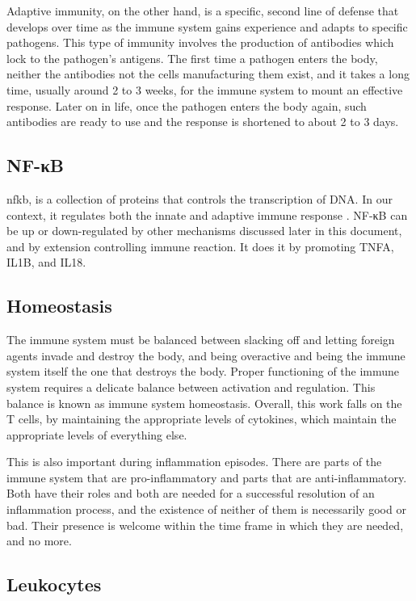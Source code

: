 Adaptive immunity, on the other hand, is a specific, second line of defense that develops over time as the immune system gains experience and adapts to specific pathogens. This type of immunity involves the production of antibodies which lock to the pathogen's antigens. The first time a pathogen enters the body, neither the antibodies not the cells manufacturing them exist, and it takes a long time, usually around 2 to 3 weeks, for the immune system to mount an effective response. Later on in life, once the pathogen enters the body again, such antibodies are ready to use and the response is shortened to about 2 to 3 days.

\subsection{NF-κB}
\label{inf:nfkb}

\gls{nfkb}, is a collection of proteins that controls the transcription of DNA. In our context, it regulates both the innate and adaptive immune response \cite{Smith2006}. NF-κB can be up or down-regulated by other mechanisms discussed later in this document, and by extension controlling immune reaction. It does it by promoting TNFA, IL1B, and IL18.


\subsection{Homeostasis}

The immune system must be balanced between slacking off and letting foreign agents invade and destroy the body, and being overactive and being the immune system itself the one that destroys the body. Proper functioning of the immune system requires a delicate balance between activation and regulation. This balance is known as immune system homeostasis. Overall, this work falls on the T cells, by maintaining the appropriate levels of cytokines, which maintain the appropriate levels of everything else.

This is also important during inflammation episodes. There are parts of the immune system that are pro-inflammatory and parts that are anti-inflammatory. Both have their roles and both are needed for a successful resolution of an inflammation process, and the existence of neither of them is necessarily good or bad. Their presence is welcome within the time frame in which they are needed, and no more.

\subsection{Leukocytes}
\label{in:leukocytes}

